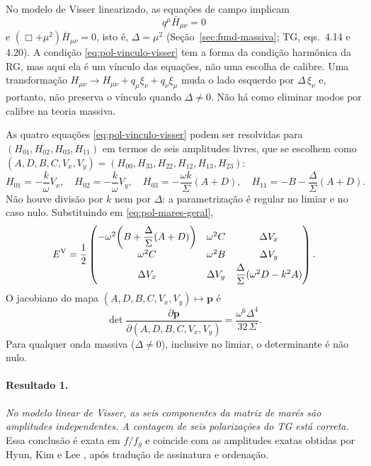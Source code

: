 No modelo de Visser linearizado, as equações de campo implicam
\begin{equation}
 q^\mu\bar H_{\mu\nu}=0
 \label{eq:pol-vinculo-visser}
\end{equation}
e $(\Box+\mu^2)\bar H_{\mu\nu}=0$, isto é, $\Delta=\mu^2$
(Seção~\ref{sec:fund-massiva}; TG, eqs.~4.14 e 4.20). A condição
\eqref{eq:pol-vinculo-visser} tem a forma da condição harmônica da RG,
mas aqui ela é um vínculo das equações, não uma escolha de calibre. Uma
transformação $H_{\mu\nu}\to H_{\mu\nu}+q_\mu\xi_\nu+q_\nu\xi_\mu$ muda
o lado esquerdo por $\Delta\,\xi_\nu$ e, portanto, não preserva o
vínculo quando $\Delta\neq0$. Não há como eliminar modos por calibre
na teoria massiva.

As quatro equações \eqref{eq:pol-vinculo-visser} podem ser resolvidas
para $(H_{01},H_{02},H_{03},H_{11})$ em termos de seis amplitudes
livres, que se escolhem como
$(A,D,B,C,V_x,V_y)=(H_{00},H_{33},H_{22},H_{12},H_{13},H_{23})$:
\begin{equation}
 H_{01}=-\frac{k}{\omega}V_x,\quad
 H_{02}=-\frac{k}{\omega}V_y,\quad
 H_{03}=-\frac{\omega k}{\Sigma}(A+D),\quad
 H_{11}=-B-\frac{\Delta}{\Sigma}(A+D).
 \label{eq:pol-solucao-visser}
\end{equation}
Não houve divisão por $k$ nem por $\Delta$: a parametrização é regular
no limiar e no caso nulo. Substituindo em
\eqref{eq:pol-mares-geral},
\begin{equation}
 E^{\rm V}=\frac12
 \begin{pmatrix}
 -\omega^2\!\left(B+\dfrac{\Delta}{\Sigma}(A+D)\right) & \omega^2C & \Delta V_x\\[2mm]
 \omega^2C & \omega^2B & \Delta V_y\\[1mm]
 \Delta V_x & \Delta V_y & \dfrac{\Delta}{\Sigma}(\omega^2D-k^2A)
 \end{pmatrix}.
 \label{eq:pol-mares-visser}
\end{equation}
O jacobiano do mapa $(A,D,B,C,V_x,V_y)\mapsto\mathbf p$ é
\begin{equation}
 \det\frac{\partial\mathbf p}{\partial(A,D,B,C,V_x,V_y)}
 =\frac{\omega^6\Delta^4}{32\,\Sigma}.
 \label{eq:pol-det-visser}
\end{equation}
Para qualquer onda massiva ($\Delta\neq0$), inclusive no limiar, o
determinante é não nulo.

\paragraph{Resultado 1.} \emph{No modelo linear de Visser, as seis
componentes da matriz de marés são amplitudes independentes. A contagem
de seis polarizações do TG está correta.} Essa conclusão é exata em
$f/f_g$ e coincide com as amplitudes exatas obtidas por Hyun, Kim e Lee
\autocite{hyun2019}, após tradução de assinatura e ordenação.


